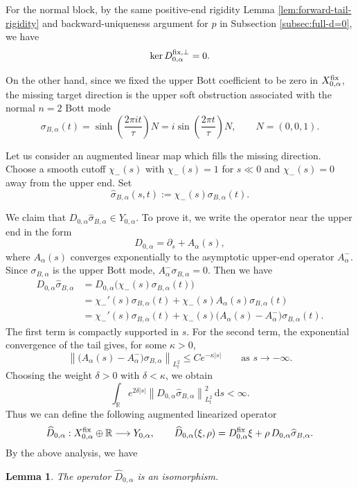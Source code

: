 \documentclass[11pt]{amsart}
\theoremstyle{plain}
\newtheorem{lem}[thm]{Lemma}
\theoremstyle{definition}
\newcommand{\R}{\mathbb{R}}
\newcommand{\dd}{\mathrm d}
\begin{document}
For the normal block, by the same positive-end rigidity Lemma \ref{lem:forward-tail-rigidity} and backward-uniqueness argument for $p$ in Subsection \ref{subsec:full-d=0}, we have
\[\ker D^{\rm{fix},\perp}_{0,\alpha}=0.\]

On the other hand, since we fixed the upper Bott coefficient to be zero in
$X^{\rm fix}_{0,\alpha}$, the missing target direction is the upper
soft obstruction associated with the normal $n=2$ Bott mode
\[
  \sigma_{B,\alpha}(t)
  =
  \sinh\left(\frac{2\pi i t}{\tau}\right)N
  =
  i\sin\left(\frac{2\pi t}{\tau}\right)N,
  \qquad
  N=(0,0,1).
\]


Let us consider an augmented linear map which fills the missing direction. Choose a smooth cutoff
$\chi_-(s)$ with $\chi_-(s)=1$ for $s\ll0$ and
$\chi_-(s)=0$ away from the upper end.  Set
\[
\widehat\sigma_{B,\alpha}(s,t):=
\chi_-(s)\sigma_{B,\alpha}(t).
\]

We claim that $D_{0,\alpha}\widehat\sigma_{B,\alpha}\in Y_{0,\alpha}$.
To prove it, we write the operator near the upper end in the form
\[
D_{0,\alpha}=\partial_s+A_\alpha(s),
\]
where $A_\alpha(s)$ converges exponentially to the asymptotic upper-end
operator $A_\alpha^-$. Since $\sigma_{B,\alpha}$ is the upper Bott mode, $A_\alpha^-\sigma_{B,\alpha}=0$. Then we have
\begin{align*}
D_{0,\alpha}\widehat\sigma_{B,\alpha}
&=D_{0,\alpha}\bigl(\chi_-(s)\sigma_{B,\alpha}(t)\bigr)\\
&=\chi_-'(s)\sigma_{B,\alpha}(t)+
\chi_-(s)A_\alpha(s)\sigma_{B,\alpha}(t) \\
&=\chi_-'(s)\sigma_{B,\alpha}(t)+
\chi_-(s)\bigl(A_\alpha(s)-A_\alpha^-\bigr)\sigma_{B,\alpha}(t).
\end{align*}
The first term is compactly supported in $s$. For the second term, the
exponential convergence of the tail gives, for some $\kappa>0$,
\[
\left\|\bigl(A_\alpha(s)-A_\alpha^-\bigr)\sigma_{B,\alpha}\right\|_{L^2_t}\le C e^{-\kappa |s|}
\qquad\text{as } s\to-\infty.
\]
Choosing the weight $\delta>0$ with $\delta<\kappa$, we obtain
\[
\int_{\mathbb R} e^{2\delta |s|}
\left\|D_{0,\alpha}\widehat\sigma_{B,\alpha}\right\|_{L^2_t}^2\,\dd s
<\infty.
\]
Thus we can define the following augmented linearized operator
\[
\widehat D_{0,\alpha}:X_{0,\alpha}^{\rm fix}\oplus\R\longrightarrow Y_{0,\alpha},\qquad
\widehat D_{0,\alpha}(\xi,\rho)
=D_{0,\alpha}^{\rm fix}\xi+
\rho\,D_{0,\alpha}\widehat\sigma_{B,\alpha}.
\]
By the above analysis, we have

\begin{lem}
\label{lem:upper-augmented-isomorphism}
The operator $\widehat D_{0,\alpha}$ is an isomorphism.
\end{lem}
\end{document}
